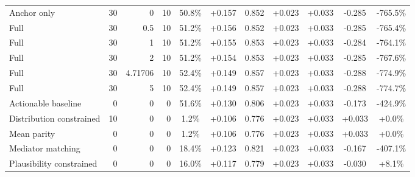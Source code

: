 \begin{table}[htbp]
\begin{tabular}{lrrrccccccc}
Anchor only & 30 & 0 & 10 & 50.8\% & +0.157 & 0.852 & +0.023 & +0.033 & -0.285 & -765.5\% \\
Full & 30 & 0.5 & 10 & 51.2\% & +0.156 & 0.852 & +0.023 & +0.033 & -0.285 & -765.4\% \\
Full & 30 & 1 & 10 & 51.2\% & +0.155 & 0.853 & +0.023 & +0.033 & -0.284 & -764.1\% \\
Full & 30 & 2 & 10 & 51.2\% & +0.154 & 0.853 & +0.023 & +0.033 & -0.285 & -767.6\% \\
Full & 30 & 4.71706 & 10 & 52.4\% & +0.149 & 0.857 & +0.023 & +0.033 & -0.288 & -774.9\% \\
Full & 30 & 5 & 10 & 52.4\% & +0.149 & 0.857 & +0.023 & +0.033 & -0.288 & -774.7\% \\
Actionable baseline & 0 & 0 & 0 & 51.6\% & +0.130 & 0.806 & +0.023 & +0.033 & -0.173 & -424.9\% \\
Distribution constrained & 10 & 0 & 0 & 1.2\% & +0.106 & 0.776 & +0.023 & +0.033 & +0.033 & +0.0\% \\
Mean parity & 0 & 0 & 0 & 1.2\% & +0.106 & 0.776 & +0.023 & +0.033 & +0.033 & +0.0\% \\
Mediator matching & 0 & 0 & 0 & 18.4\% & +0.123 & 0.821 & +0.023 & +0.033 & -0.167 & -407.1\% \\
Plausibility constrained & 0 & 0 & 0 & 16.0\% & +0.117 & 0.779 & +0.023 & +0.033 & -0.030 & +8.1\% \\
\bottomrule
\end{tabular}
\end{table}